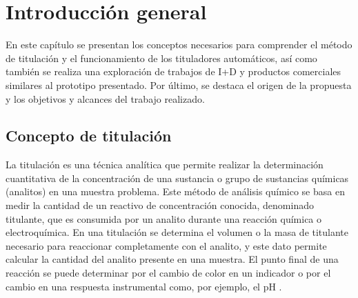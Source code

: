 
\chapter{Introducción general} %

\label{Chapter1} %
\label{IntroGeneral}


\newcommand{\keyword}[1]{\textbf{#1}}
\newcommand{\tabhead}[1]{\textbf{#1}}
\newcommand{\code}[1]{\texttt{#1}}
\newcommand{\file}[1]{\texttt{\bfseries#1}}
\newcommand{\option}[1]{\texttt{\itshape#1}}
\newcommand{\grados}{$^{\circ}$}


En este capítulo se presentan los conceptos necesarios para comprender el método de titulación y el funcionamiento de los tituladores automáticos, así como también se realiza una exploración de trabajos de I+D y productos comerciales similares al prototipo presentado. Por último, se destaca el origen de la propuesta y los objetivos y alcances del trabajo realizado.

\section{Concepto de titulación}

La titulación es una técnica analítica que permite realizar la determinación cuantitativa de la concentración de una sustancia o grupo de sustancias químicas (analitos) en una muestra problema. Este método de análisis químico se basa en medir la cantidad de un reactivo de concentración conocida, denominado titulante, que es consumida por un analito durante una reacción química o electroquímica. En una titulación se determina el volumen o la masa de titulante necesario para reaccionar completamente con el analito, y este dato permite calcular la cantidad del analito presente en una muestra. El punto final de una reacción se puede determinar por el cambio de color en un indicador o por el cambio en una respuesta instrumental como, por ejemplo, el pH \citep{BOOK:1}.

